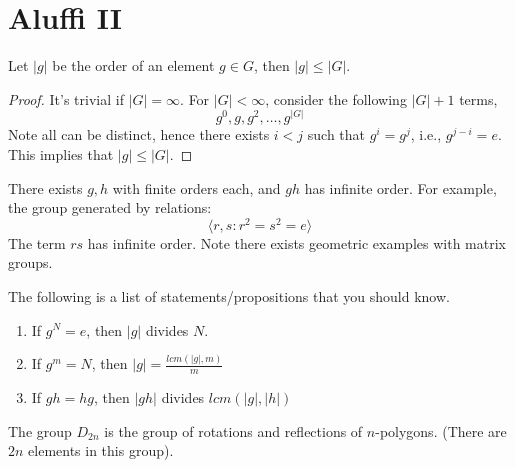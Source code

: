 \chapter{Aluffi II}

\begin{prop}
    Let $|g|$ be the order of an element $g\in G$, then $|g|\leq |G|$.
\end{prop}
\begin{proof}
    It's trivial if $|G|=\infty$. For $|G|<\infty$, consider the following $|G|+1$ terms,
    \begin{equation*}
        g^0, g, g^2, \ldots, g^{|G|}
    \end{equation*}
    Note all can be distinct, hence there exists $i<j$ such that $g^{i}=g^j$, i.e., $g^{j-i}=e$. This implies that $|g|\leq |G|$.
\end{proof}
\begin{example}
    There exists $g, h$ with finite orders each, and $gh$ has infinite order. For example, the group generated by relations:
    \begin{equation*}
        \langle r,s: r^2=s^2=e\rangle
    \end{equation*}
    The term $rs$ has infinite order. Note there exists geometric examples with matrix groups.
\end{example}
\begin{prop} The following is a list of statements/propositions that you should know.
\begin{enumerate}
    \item If $g^N=e$, then $|g|$ divides $N$.
    \item If $g^m=N$, then $|g|=\frac{lcm(|g|, m)}{m}$
    \item If $gh=hg$, then $|gh|$ divides $lcm(|g|, |h|)$
\end{enumerate}
\end{prop}


\begin{defn}
    The group $D_{2n}$ is the group of rotations and reflections of $n$-polygons. (There are $2n$ elements in this group).
\end{defn}



